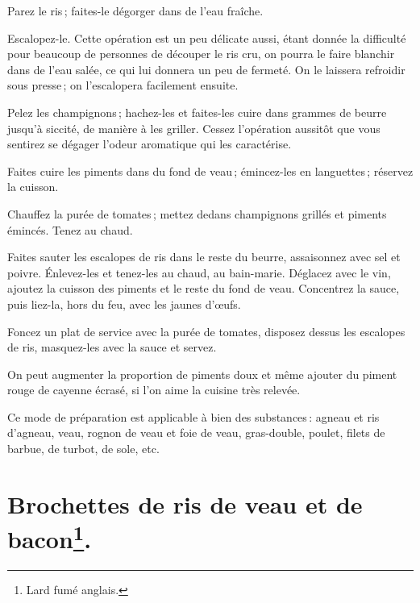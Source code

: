 Parez le ris ; faites-le dégorger dans de l'eau fraîche.

Escalopez-le. Cette opération est un peu délicate aussi, étant donnée la
difficulté pour beaucoup de personnes de découper le ris cru, on pourra le
faire blanchir dans de l'eau salée, ce qui lui donnera un peu de fermeté. On le
laissera refroidir sous presse ; on l'escalopera facilement ensuite.

Pelez les champignons ; hachez-les et faites-les cuire dans {\mmm} grammes de
beurre jusqu'à siccité, de manière à les griller. Cessez l'opération aussitôt
que vous sentirez se dégager l'odeur aromatique qui les caractérise.

Faites cuire les piments dans du fond de veau ; émincez-les en languettes ;
réservez la cuisson.

Chauffez la purée de tomates ; mettez dedans champignons grillés et piments
émincés. Tenez au chaud.

Faites sauter les escalopes de ris dans le reste du beurre, assaisonnez avec
sel et poivre. Énlevez-les et tenez-les au chaud, au bain-marie. Déglacez avec
le vin, ajoutez la cuisson des piments et le reste du fond de veau. Concentrez
la sauce, puis liez-la, hors du feu, avec les jaunes d'œufs.

Foncez un plat de service avec la purée de tomates, disposez dessus les escalopes
de ris, masquez-les avec la sauce et servez.

\sk

On peut augmenter la proportion de piments doux et même ajouter du piment rouge
de cayenne écrasé, si l'on aime la cuisine très relevée.

\sk

Ce mode de préparation est applicable à bien des substances : agneau et ris
d'agneau, veau, rognon de veau et foie de veau, gras-double, poulet, filets de
barbue, de turbot, de sole, etc.

\section*{\centering Brochettes de ris de veau et de bacon\footnote{Lard fumé anglais.}.}
{}

